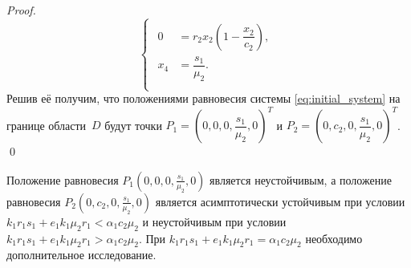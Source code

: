 \documentclass[14pt,a4paper]{extarticle}
\begin{document}
\begin{proof}
		\begin{equation*}
			\begin{cases}
				\begin{aligned}
					0 &= r_2x_2\left(1-\dfrac{x_2}{c_2}\right),\\
					x_4 &= \dfrac{s_1}{\mu_2}.\\
				\end{aligned}
			\end{cases}
		\end{equation*}
		Решив её получим, что положениями равновесия системы \ref{eq:initial_system} на границе области~$D$ будут точки $P_1 = \left(0,0,0,\dfrac{s_1}{\mu_2},0\right)^T$ и $P_2=\left(0,c_2,0,\dfrac{s_1}{\mu_2},0\right)^T$. \qed
	\end{proof}
	
	\begin{theorem}\label{th:border_stab}
		Положение равновесия $P_1\left(0,0,0,\frac{s_1}{\mu_2},0\right)$ является неустойчивым, а положение равновесия $P_2\left(0,c_2,0,\frac{s_1}{\mu_2},0\right)$ является асимптотически устойчивым при условии $k_1r_1s_1 + e_1k_1\mu_2r_1< \alpha_1c_2\mu_2$ и неустойчивым при условии $k_1r_1s_1 + e_1k_1\mu_2r_1>\alpha_1c_2\mu_2$. При $k_1r_1s_1 + e_1k_1\mu_2r_1 = \alpha_1c_2\mu_2$ необходимо дополнительное исследование.
	\end{theorem}
\end{document}
